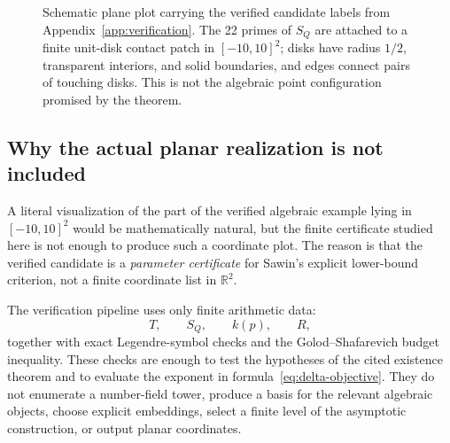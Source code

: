 \documentclass[a4paper,12pt]{article}
\begin{document}
\begin{figure}[htbp]
\caption{Schematic plane plot carrying the verified candidate labels from Appendix~\ref{app:verification}.  The 22 primes of $S_Q$ are attached to a finite unit-disk contact patch in $[-10,10]^2$; disks have radius $1/2$, transparent interiors, and solid boundaries, and edges connect pairs of touching disks.  This is not the algebraic point configuration promised by the theorem.}
\label{fig:verified-candidate-plane}
\end{figure}

\subsection*{Why the actual planar realization is not included}

A literal visualization of the part of the verified algebraic example lying in $[-10,10]^2$ would be mathematically natural, but the finite certificate studied here is not enough to produce such a coordinate plot.  The reason is that the verified candidate is a \emph{parameter certificate} for Sawin's explicit lower-bound criterion, not a finite coordinate list in $\mathbb{R}^2$.

The verification pipeline uses only finite arithmetic data:
\[
T,\qquad S_Q,\qquad k(p),\qquad R,
\]
together with exact Legendre-symbol checks and the Golod--Shafarevich budget inequality.  These checks are enough to test the hypotheses of the cited existence theorem and to evaluate the exponent in formula~\eqref{eq:delta-objective}.  They do not enumerate a number-field tower, produce a basis for the relevant algebraic objects, choose explicit embeddings, select a finite level of the asymptotic construction, or output planar coordinates.
\end{document}
